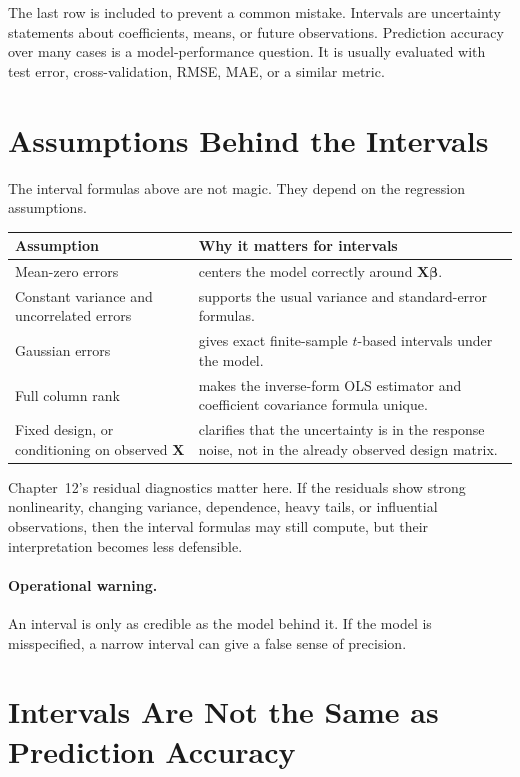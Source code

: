 The last row is included to prevent a common mistake.  Intervals are uncertainty statements about coefficients, means, or future observations.  Prediction accuracy over many cases is a model-performance question.  It is usually evaluated with test error, cross-validation, RMSE, MAE, or a similar metric.

\section{Assumptions Behind the Intervals}

The interval formulas above are not magic.  They depend on the regression assumptions.

\begin{center}
\begin{tabular}{p{}p{}}
\toprule
\textbf{Assumption} & \textbf{Why it matters for intervals} \\
\midrule
Mean-zero errors & centers the model correctly around \(\mathbf{X}\boldsymbol{\beta}\). \\
Constant variance and uncorrelated errors & supports the usual variance and standard-error formulas. \\
Gaussian errors & gives exact finite-sample \(t\)-based intervals under the model. \\
Full column rank & makes the inverse-form OLS estimator and coefficient covariance formula unique. \\
Fixed design, or conditioning on observed \(\mathbf{X}\) & clarifies that the uncertainty is in the response noise, not in the already observed design matrix. \\
\bottomrule
\end{tabular}
\end{center}

Chapter~12's residual diagnostics matter here.  If the residuals show strong nonlinearity, changing variance, dependence, heavy tails, or influential observations, then the interval formulas may still compute, but their interpretation becomes less defensible.

\paragraph{Operational warning.}
An interval is only as credible as the model behind it.  If the model is misspecified, a narrow interval can give a false sense of precision.

\section{Intervals Are Not the Same as Prediction Accuracy}

